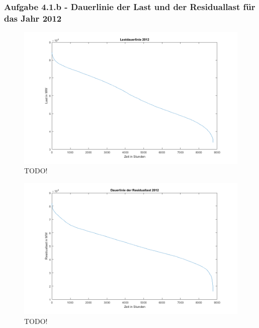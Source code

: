 \documentclass[a4paper,12pt]{article}
\begin{document}
	\subsubsection{Aufgabe 4.1.b - Dauerlinie der Last und der Residuallast für das Jahr 2012}
	\begin{figure}[H]
		\centering
		\includegraphics[width=12cm]{img/results/Lastdauerlinie2012}
		\caption{TODO!}
	\end{figure}
	\begin{figure}[H]
		\centering
		\includegraphics[width=12cm]{img/results/DauerlinieResiduallast2012}
		\caption{TODO!}
	\end{figure}
\end{document}
